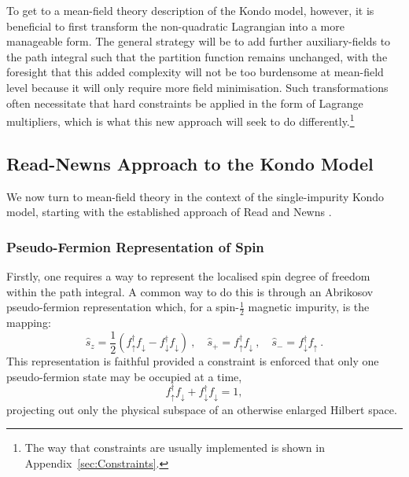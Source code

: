 To get to a mean-field theory description of the Kondo model, however, it is beneficial to first transform the non-quadratic Lagrangian into a more manageable form. The general strategy will be to add further auxiliary-fields to the path integral such that the partition function remains unchanged, with the foresight that this added complexity will not be too burdensome at mean-field level because it will only require more field minimisation. Such transformations often necessitate that hard constraints be applied in the form of Lagrange multipliers, which is what this new approach will seek to do differently.\footnote{The way that constraints are usually implemented is shown in Appendix~\ref{sec:Constraints}.}


\subsection{Read-Newns Approach to the Kondo Model}

We now turn to mean-field theory in the context of the single-impurity Kondo model, starting with the established approach of Read and Newns \cite{ReadNewns}.

\subsubsection{Pseudo-Fermion Representation of Spin}
\label{subsubsec:pseudo-fermion}

Firstly, one requires a way to represent the localised spin degree of freedom within the path integral. A common way to do this is through an Abrikosov pseudo-fermion representation which, for a spin-$\frac{1}{2}$ magnetic impurity, is the mapping:
\begin{equation}
\hat{s}_{z} = \frac{1}{2} \left( f^{\dagger}_{\uparrow} f^{}_{\downarrow} - f^{\dagger}_{\downarrow} f^{}_{\downarrow} \right)~, \quad \hat{s}_{+} = f^{\dagger}_{\uparrow} f^{}_{\downarrow}~, \quad \hat{s}_{-} = f^{\dagger}_{\downarrow} f^{}_{\uparrow}~.
\end{equation}
This representation is faithful provided a constraint is enforced that only one pseudo-fermion state may be occupied at a time,
\begin{equation}
f^{\dagger}_{\uparrow} f^{}_{\downarrow} + f^{\dagger}_{\downarrow} f^{}_{\downarrow} = 1,
\end{equation}
projecting out only the physical subspace of an otherwise enlarged Hilbert space.

